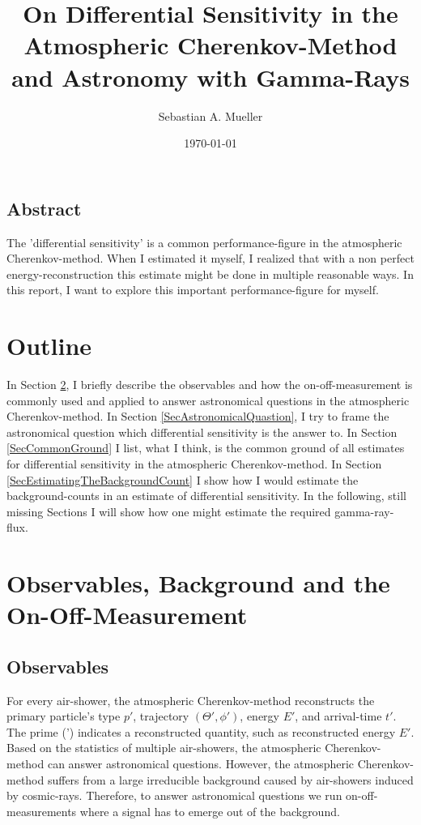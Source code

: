 \documentclass{article}%
\title{
    On Differential Sensitivity in the Atmospheric Cherenkov-Method and Astronomy with Gamma-Rays
}%
\author{Sebastian A. Mueller}%
\date{\today{}}%
\begin{document}
%
\maketitle%
%
\newcommand{\dd}[2]{\frac{\mathrm{d}#1}{\mathrm{d}#2}}
%
\subsection*{Abstract}
The 'differential sensitivity' is a common performance-figure in the atmospheric Cherenkov-method.
%
When I estimated it myself, I realized that with a non perfect energy-reconstruction this estimate might be done in multiple reasonable ways.
%
In this report, I want to explore this important performance-figure for myself.
%
\section{Outline}
%
In Section \ref{SecObservablesAndOnOff}, I briefly describe the observables and how the on-off-measurement is commonly used and applied to answer astronomical questions in the atmospheric Cherenkov-method.
%
In Section \ref{SecAstronomicalQuastion}, I try to frame the astronomical question which differential sensitivity is the answer to.
%
In Section \ref{SecCommonGround} I list, what I think, is the common ground of all estimates for differential sensitivity in the atmospheric Cherenkov-method.
%
In Section \ref{SecEstimatingTheBackgroundCount} I show how I would estimate the background-counts in an estimate of differential sensitivity.
%
In the following, still missing Sections I will show how one might estimate the required gamma-ray-flux.
%
\section{Observables, Background and the On-Off-Measurement}
\label{SecObservablesAndOnOff}
\subsection*{Observables}
%
For every air-shower, the atmospheric Cherenkov-method reconstructs the primary particle's type $p'$, trajectory $(\Theta', \phi')$, energy $E'$, and arrival-time $t'$.
%
The prime (') indicates a reconstructed quantity, such as reconstructed energy $E'$.
%
Based on the statistics of multiple air-showers, the atmospheric Cherenkov-method can answer astronomical questions.
%
However, the atmospheric Cherenkov-method suffers from a large irreducible background caused by air-showers induced by cosmic-rays.
%
Therefore, to answer astronomical questions we run on-off-measurements where a signal has to emerge out of the background.
%
\end{document}
